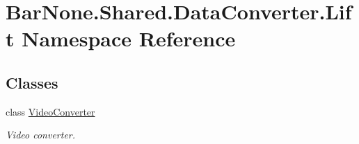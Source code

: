 \hypertarget{namespace_bar_none_1_1_shared_1_1_data_converter_1_1_lift}{}\section{Bar\+None.\+Shared.\+Data\+Converter.\+Lift Namespace Reference}
\label{namespace_bar_none_1_1_shared_1_1_data_converter_1_1_lift}
\subsection*{Classes}
\begin{DoxyCompactItemize}
\item 
class \mbox{\hyperlink{class_bar_none_1_1_shared_1_1_data_converter_1_1_lift_1_1_video_converter}{Video\+Converter}}
\begin{DoxyCompactList}\small\item\em Video converter. \end{DoxyCompactList}\end{DoxyCompactItemize}
